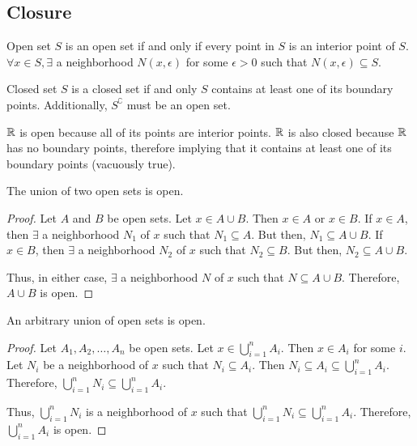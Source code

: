 \subsection{Closure}
\begin{definition}{Open set}{}
    $S$ is an open set if and only if every point in $S$ is an interior point of $S$. $\forall x \in S, \exists$ a neighborhood $N(x, \epsilon)$ for some $\epsilon > 0$ such that $N(x, \epsilon) \subseteq S$.
\end{definition}

\begin{definition}{Closed set}{}
    $S$ is a closed set if and only $S$ contains at least one of its boundary points. Additionally, $S^\complement$ must be an open set.
\end{definition}

\begin{note}
    $\mathbb{R}$ is open because all of its points are interior points. $\mathbb{R}$ is also closed because $\mathbb{R}$ has no boundary points, therefore implying that it contains at least one of its boundary points (vacuously true).
\end{note}

\begin{theorem}{}{}
    The union of two open sets is open.
\end{theorem}
\begin{proof}
    Let $A$ and $B$ be open sets. Let $x \in A \cup B$. Then $x \in A$ or $x \in B$. If $x \in A$, then $\exists$ a neighborhood $N_1$ of $x$ such that $N_1 \subseteq A$. But then, $N_1 \subseteq A \cup B$. If $x \in B$, then $\exists$ a neighborhood $N_2$ of $x$ such that $N_2 \subseteq B$. But then, $N_2 \subseteq A \cup B$. 
    
    Thus, in either case, $\exists$ a neighborhood $N$ of $x$ such that $N \subseteq A \cup B$. Therefore, $A \cup B$ is open.
\end{proof}

\begin{theorem}{}{}
    An arbitrary union of open sets is open.
\end{theorem}
\begin{proof}
    Let $A_1, A_2, \ldots, A_n$ be open sets. Let $x \in \bigcup_{i=1}^n A_i$. Then $x \in A_i$ for some $i$. Let $N_i$ be a neighborhood of $x$ such that $N_i \subseteq A_i$. Then $N_i \subseteq A_i \subseteq \bigcup_{i=1}^n A_i$. Therefore, $\bigcup_{i=1}^n N_i \subseteq \bigcup_{i=1}^n A_i$. 
    
    Thus, $\bigcup_{i=1}^n N_i$ is a neighborhood of $x$ such that $\bigcup_{i=1}^n N_i \subseteq \bigcup_{i=1}^n A_i$. Therefore, $\bigcup_{i=1}^n A_i$ is open.
\end{proof}

